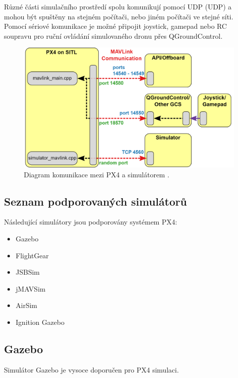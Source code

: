 Různé části simulačního prostředí spolu komunikují pomocí \acs{UDP} (\acl{UDP}) a mohou být spuštěny na stejném počítači, nebo jiném počítači ve stejné síti. Pomocí sériové komunikace je možné připojit joystick, gamepad nebo RC soupravu pro ruční ovládání simulovaného dronu přes QGroundControl.

\begin{figure}[!ht]
  \begin{center}
    \includegraphics[scale=0.3]{obrazky/SIM2}
  \end{center}
  \caption[Diagram komunikace mezi PX4 a simulátorem]{Diagram komunikace mezi PX4 a simulátorem \cite{PX4docs}.}
  \label{fig:SIM2}
\end{figure}

\subsection{Seznam podporovaných simulátorů}

Následující simulátory jsou podporovány systémem PX4:

\begin{itemize}
    \item Gazebo
    \item FlightGear
    \item JSBSim
    \item jMAVSim
    \item AirSim
    \item Ignition Gazebo
\end{itemize}

\subsection{Gazebo}

Simulátor Gazebo je vysoce doporučen pro PX4 simulaci.


